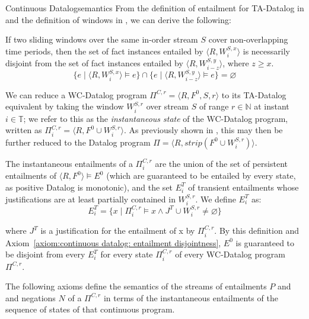 \begin{nestedsection}{Continuous Datalog}{semantics}
From the definition of entailment for TA-Datalog in  and the definition of windows in
, we can derive the following:

\begin{axiom}\label{axiom:continuous datalog: entailment disjointness}

If two sliding windows over the same in-order stream $S$ cover
non-overlapping time periods, then the set of fact instances entailed
by ${\langle R, W^{S,x}_i \rangle}$ is necessarily disjoint from the
set of fact instances entailed by $\langle R, W^{S,y}_{i-z} \rangle$,
where ${z \geq x}$.
\[
\{ e \mid \langle R , W^{S,x}_i \rangle \models e \} \cap \{ e \mid \langle R , W^{S,y}_{i-z} \rangle \models e \} = \varnothing
\]
\end{axiom}

\begin{definition}
\label{def:continuous datalog: CDPt}

We can reduce a WC-Datalog program $\Pi^{C,r} = \langle R, F^0, S, r
\rangle$ to its TA-Datalog equivalent by taking the window $W^{S,r}_i$
over stream $S$ of range $r \in \mathbb{N}$ at instant $i \in
\mathbb{T}$; we refer to this as the {\em instantaneous state} of the
WC-Datalog program, written as $\Pi^{C,r}_i = \langle R, F^0 \cup W^{S,r}_i
\rangle$. As previously shown in , this may then be further reduced to the Datalog
program $\Pi = \langle R, strip(F^0 \cup W^{S,r}_i) \rangle$.

The instantaneous entailments of a $\Pi^{C,r}_i$ are the union of the set
of persistent entailments of ${\langle R, F^0 \rangle \vDash E^0}$
(which are guaranteed to be entailed by every state, as positive
Datalog is monotonic), and the set $E^T_{i}$ of transient entailments
whose justifications are at least partially contained in
$W^{S,r}_i$. We define $E^T_i$ as:
\[
E^T_i = \{ x \mid \Pi^{C,r}_i \models x \land J^T \cup W^{S,r}_i \neq \varnothing \}
\]

\noindent where $J^T$ is a justification for the entailment of x by
$\Pi^{C,r}_i$. By this definition and Axiom~\ref{axiom:continuous
  datalog: entailment disjointness}, $E^0$ is guaranteed to be
disjoint from every $E^T_i$ for every state $\Pi^{C,r}_i$ of every
WC-Datalog program $\Pi^{C,r}$.
\end{definition}

The following axioms define the semantics of the streams of
entailments $P$ and and negations $N$ of a $\Pi^{C,r}$ in terms of the
instantaneous entailments of the sequence of states of that continuous
program.


\end{nestedsection}
